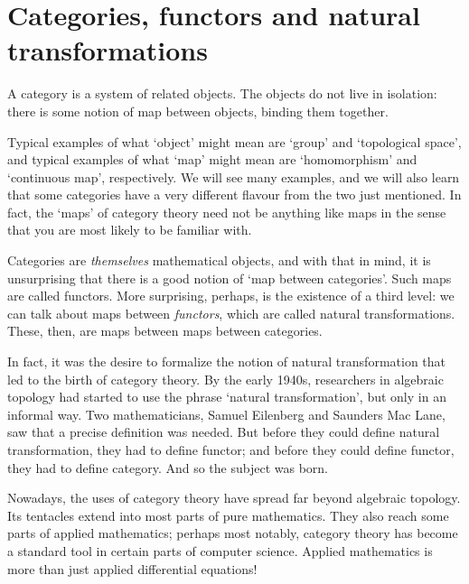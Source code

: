 % 
% 
% 

\chapter{Categories, functors and natural transformations}
\label{ch:cfnt}

A category is a system of related objects.  The objects do not live in
isolation: there is some notion of map between objects, binding them
together.

Typical examples of what `object' might mean are `group' and `topological
space', and typical examples of what `map' might mean are `homomorphism'
and `continuous map', respectively.  We will see many examples, and we will
also learn that some categories have a very different flavour from the two
just mentioned.  In fact, the `maps' of category theory need not be
anything like maps in the sense that you are most likely to be familiar
with.

Categories are \emph{themselves} mathematical objects, and with that in
mind, it is unsurprising that there is a good notion of `map between
categories'.  Such maps are called functors.  More surprising, perhaps, is
the existence of a third level: we can talk about maps between
\emph{functors}, which are called natural transformations.  These, then,
are maps between maps between categories.

In fact, it was the desire to formalize the notion of natural
transformation that led to the birth of category theory.  By the early
1940s, researchers in algebraic topology had started to use the phrase
`natural transformation', but only in an informal way.  Two mathematicians,
Samuel Eilenberg%
%
%
and Saunders Mac Lane,%
%
%
saw that a precise definition was needed.  But before they could define
natural transformation, they had to define functor; and before they could
define functor, they had to define category.  And so the subject was born.

Nowadays, the uses of category theory have spread far beyond algebraic
topology.  Its tentacles extend into most parts of pure mathematics.  They
also reach some parts of applied mathematics; perhaps most notably,
category theory has become a standard tool in certain parts of computer%
%
%
science.  Applied%
%
% 
mathematics is more than just applied differential equations!


